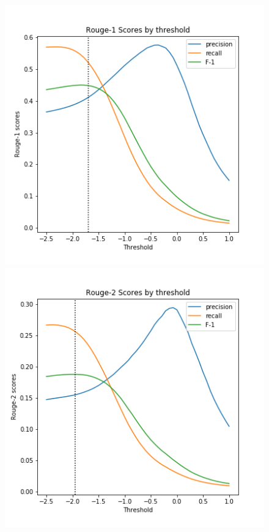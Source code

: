 \documentclass[11pt,a4paper]{article}
\begin{document}
\begin{figure}[t]
	\centering
	\begin{minipage}{.33\linewidth}
		\includegraphics[width=\linewidth]{plots/rouge-1.png}
	\end{minipage}
	\begin{minipage}{.33\linewidth}
		\includegraphics[width=\linewidth]{plots/rouge-2.png}

\end{minipage}
\end{figure}
\end{document}
